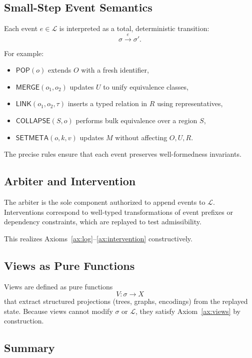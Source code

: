 \documentclass[11pt]{article}
\begin{document}
\subsection{Small-Step Event Semantics}

Each event $e \in \mathcal{L}$ is interpreted as a total, deterministic transition:
\[
\sigma \xrightarrow{e} \sigma'.
\]

For example:
\begin{itemize}
  \item $\mathsf{POP}(o)$ extends $O$ with a fresh identifier,
  \item $\mathsf{MERGE}(o_1,o_2)$ updates $U$ to unify equivalence classes,
  \item $\mathsf{LINK}(o_1,o_2,\tau)$ inserts a typed relation in $R$ using representatives,
  \item $\mathsf{COLLAPSE}(S,o)$ performs bulk equivalence over a region $S$,
  \item $\mathsf{SETMETA}(o,k,v)$ updates $M$ without affecting $O,U,R$.
\end{itemize}

The precise rules ensure that each event preserves well-formedness invariants.

\subsection{Arbiter and Intervention}

The arbiter is the sole component authorized to append events to $\mathcal{L}$. Interventions correspond to well-typed transformations of event prefixes or dependency constraints, which are replayed to test admissibility.

This realizes Axioms~\ref{ax:log}--\ref{ax:intervention} constructively.

\subsection{Views as Pure Functions}

Views are defined as pure functions
\[
V : \sigma \to X
\]
that extract structured projections (trees, graphs, encodings) from the replayed state. Because views cannot modify $\sigma$ or $\mathcal{L}$, they satisfy Axiom~\ref{ax:views} by construction.

\subsection{Summary}
\end{document}
